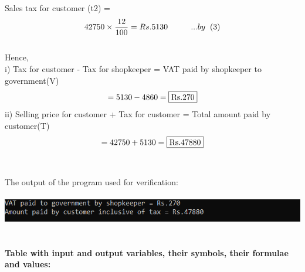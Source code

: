 \documentclass[12pt, twocolumn]{article}
\begin{document}
Sales tax for customer (t2) = \begin{equation*}\\
    42750\times\frac{12}{100} = Rs.5130 \hspace{1cm}... by \hspace{0.2cm} (3)\\
\end{equation*} \\
Hence,\\
i) Tax for customer - Tax for shopkeeper = 
    VAT paid by shopkeeper to government(V)  \\
     \begin{equation*}
        = 5130 - 4860 = \fbox{Rs.270}\\
   \end{equation*}
ii) Selling price for customer + Tax for customer = Total amount paid by customer(T)\\ 
    \begin{equation*}
       = 42750 + 5130 = \fbox{Rs.47880}\\
   \end{equation*} \\ \\
The output of the program used for verification:\\ \\
\includegraphics[scale=1.1]{codeoutput.png} \\ \\ \\
\textbf{Table with input and output variables, their symbols, their formulae and values:}
\begin{table}[h]
  
  \end{table}
\end{document}
